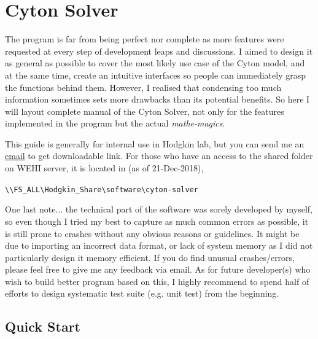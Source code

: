 \documentclass{article}
\newcommand{\enterProblemHeader}[1]{
    }
\newcommand{\exitProblemHeader}[1]{
    }
\newcounter{homeworkProblemCounter} %
\newcommand{\homeworkProblemName}{}
\newenvironment{homeworkProblem}[1][Problem \arabic{homeworkProblemCounter}]{ %
    \stepcounter{homeworkProblemCounter} %
    \renewcommand{\homeworkProblemName}{#1} %
    \section{\homeworkProblemName} %
    \enterProblemHeader{\homeworkProblemName} %
    }{
    \exitProblemHeader{\homeworkProblemName} %
    }
\begin{document}
    \clearpage
    \begin{homeworkProblem}[Cyton Solver]
        The program is far from being perfect nor complete as more features were requested at every step of development leaps and discussions. I aimed to design it as general as possible to cover the most likely use case of the Cyton model, and at the same time, create an intuitive interfaces so people can immediately grasp the functions behind them. However, I realised that condensing too much information sometimes sets more drawbacks than its potential benefits. So here I will layout complete manual of the Cyton Solver, not only for the features implemented in the program but the actual \textit{mathe-magics}. 
        

        This guide is generally for internal use in Hodgkin lab, but you can send me an \href{mailto:cheon.h@wehi.edu.au}{email} to get downloadable link. For those who have an access to the shared folder on WEHI server, it is located in (as of 21-Dec-2018), 

        \begin{center}  
            \verb+\\FS_ALL\Hodgkin_Share\software\cyton-solver+
        \end{center}

        One last note... the technical part of the software was sorely developed by myself, so even though I tried my best to capture as much common errors as possible, it is still prone to crashes without any obvious reasons or guidelines. It might be due to importing an incorrect data format, or lack of system memory as I did not particularly design it memory efficient. If you do find unusual crashes/errors, please feel free to give me any feedback via email. As for future developer(s) who wish to build better program based on this, I highly recommend to spend half of efforts to design systematic test suite (e.g. unit test) from the beginning.
        
        \subsection{Quick Start}

\end{homeworkProblem}
\end{document}
